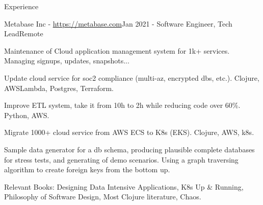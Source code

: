 \documentclass{resume} %
\begin{document}
\begin{rSection}{Experience}
  \begin{rSubsection}{Metabase Inc - \url{https://metabase.com}}{Jan 2021 - }{Software Engineer, Tech Lead}{Remote}
  \item Maintenance of Cloud application management system for 1k+
	  services. Managing signups, updates, snapshots...
  \item Update cloud service for soc2 compliance (multi-az, encrypted dbs,
	  etc.). Clojure, AWSLambda, Postgres, Terraform.
  \item Improve ETL system, take it from 10h to 2h while reducing code over
	  60\%. Python, AWS.
  \item Migrate 1000+ cloud service from AWS ECS to K8s (EKS). Clojure, AWS,
	  k8s.
  \item Sample data generator for a db schema, producing plausible complete
	  databases for stress tests, and generating of demo scenarios. Using a
	  graph traversing algorithm to create foreign keys from the bottom up.
  \item Relevant Books: Designing Data Intensive Applications, K8s Up \&
	  Running, Philosophy of Software Design, Most Clojure literature, Chaos.
  \end{rSubsection}


\end{rSection}
\end{document}
